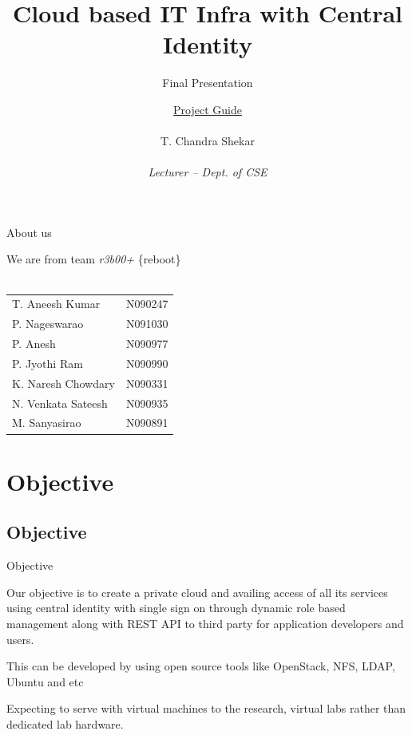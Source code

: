 \documentclass[10pt,xcolor=dvipsnames]{beamer}
\title[Cloud based IT Infra with Central Identity]{Cloud based IT Infra with Central Identity}
\subtitle{Final Presentation}
\author{ \underline{Project Guide} \\ \hspace{2mm} \\ \small{ T. Chandra Shekar } \tiny \\ \underline{} \\ \scriptsize \textit{Lecturer -- Dept. of CSE} }
\institute{ \underline{Presenting by} \\ \hspace{2mm} \\ \textit {Team r3b00+ }  \\ \hspace{4mm} \\ Dept. of CSE, RGUKT -- Nuzvid}
\begin{document}
\begin{frame}
\titlepage
\end{frame}


\begin{frame}{About us}

\small
\begin{center}
We are from team \textit{r3b00+}  \{reboot\} \\ \hspace{4cm} \\
\begin{tabular}{l  l }
T. Aneesh Kumar & N090247   \\
P. Nageswarao  & N091030  \\
P. Anesh  & N090977 \\
P. Jyothi Ram & N090990 \\
K. Naresh Chowdary  & N090331 \\
N. Venkata Sateesh  & N090935 \\
M. Sanyasirao & N090891  
\end{tabular}


\end{center}


\end{frame}
 

\section{Objective}
\subsection{Objective}
\begin{frame}{Objective}

Our objective is to create a  private cloud and availing access of all its services using central identity with single sign on through dynamic role based management along with REST API to third party for application developers and users. \newline

This can be developed by using open source tools like OpenStack, NFS, LDAP, Ubuntu and etc \newline

Expecting to serve with virtual machines to the research, virtual labs rather than dedicated lab hardware.
\end{frame}
\end{document}
